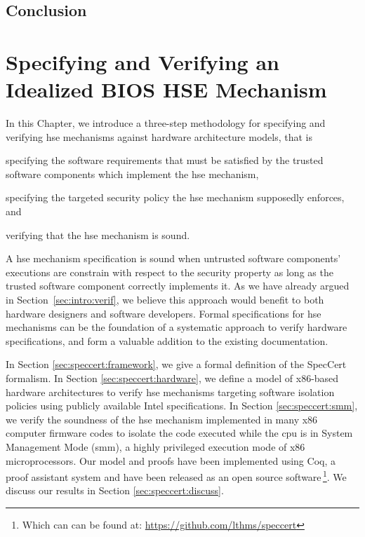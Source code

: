 \section{Conclusion}

\chapter{Specifying and Verifying an Idealized BIOS HSE Mechanism}

\newpage

In this Chapter, we introduce a three-step methodology for specifying and
verifying \ac{hse} mechanisms against hardware architecture models, that is
%
\begin{inparaenum}[(1)]
\item specifying the software requirements that must be satisfied by the trusted
  software components which implement the \ac{hse} mechanism,
%
\item specifying the targeted security policy the \ac{hse} mechanism
  supposedly enforces, and
%
\item verifying that the \ac{hse} mechanism is sound.
\end{inparaenum}
%
A \ac{hse} mechanism specification is sound when untrusted software components'
executions are constrain with respect to the security property as long as the
trusted software component correctly implements it.
%
As we have already argued in Section~\ref{sec:intro:verif}, we believe this
approach would benefit to both hardware designers and software developers.
%
Formal specifications for \ac{hse} mechanisms can be the foundation of a
systematic approach to verify hardware specifications, and form a valuable
addition to the existing documentation.

In Section \ref{sec:speccert:framework}, we give a formal definition of the
SpecCert formalism.
%
In Section \ref{sec:speccert:hardware}, we define a model of x86-based hardware
architectures to verify \ac{hse} mechanisms targeting software isolation
policies using publicly available Intel specifications.
%
In Section \ref{sec:speccert:smm}, we verify the soundness of the \ac{hse}
mechanism implemented in many x86 computer firmware codes to isolate the code
executed while the \ac{cpu} is in System Management Mode (\ac{smm}), a highly
privileged execution mode of x86 microprocessors.
%
Our model and proofs have been implemented using Coq, a proof assistant system
and have been released as an open source software\,\footnote{Which can can be
  found at: \url{https://github.com/lthms/speccert}}.
%
We discuss our results in Section \ref{sec:speccert:discuss}.

